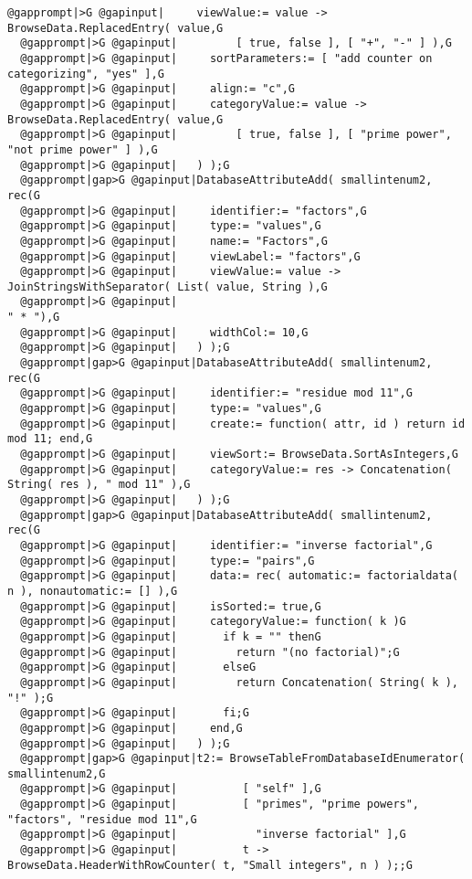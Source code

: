 \documentclass[a4paper,11pt]{report}
\begin{document}
{{\begin{Verbatim}[commandchars=@|G,fontsize=\small,frame=single,label=Example]
  @gapprompt|>G @gapinput|     viewValue:= value -> BrowseData.ReplacedEntry( value,G
  @gapprompt|>G @gapinput|         [ true, false ], [ "+", "-" ] ),G
  @gapprompt|>G @gapinput|     sortParameters:= [ "add counter on categorizing", "yes" ],G
  @gapprompt|>G @gapinput|     align:= "c",G
  @gapprompt|>G @gapinput|     categoryValue:= value -> BrowseData.ReplacedEntry( value,G
  @gapprompt|>G @gapinput|         [ true, false ], [ "prime power", "not prime power" ] ),G
  @gapprompt|>G @gapinput|   ) );G
  @gapprompt|gap>G @gapinput|DatabaseAttributeAdd( smallintenum2, rec(G
  @gapprompt|>G @gapinput|     identifier:= "factors",G
  @gapprompt|>G @gapinput|     type:= "values",G
  @gapprompt|>G @gapinput|     name:= "Factors",G
  @gapprompt|>G @gapinput|     viewLabel:= "factors",G
  @gapprompt|>G @gapinput|     viewValue:= value -> JoinStringsWithSeparator( List( value, String ),G
  @gapprompt|>G @gapinput|                                                    " * "),G
  @gapprompt|>G @gapinput|     widthCol:= 10,G
  @gapprompt|>G @gapinput|   ) );G
  @gapprompt|gap>G @gapinput|DatabaseAttributeAdd( smallintenum2, rec(G
  @gapprompt|>G @gapinput|     identifier:= "residue mod 11",G
  @gapprompt|>G @gapinput|     type:= "values",G
  @gapprompt|>G @gapinput|     create:= function( attr, id ) return id mod 11; end,G
  @gapprompt|>G @gapinput|     viewSort:= BrowseData.SortAsIntegers,G
  @gapprompt|>G @gapinput|     categoryValue:= res -> Concatenation( String( res ), " mod 11" ),G
  @gapprompt|>G @gapinput|   ) );G
  @gapprompt|gap>G @gapinput|DatabaseAttributeAdd( smallintenum2, rec(G
  @gapprompt|>G @gapinput|     identifier:= "inverse factorial",G
  @gapprompt|>G @gapinput|     type:= "pairs",G
  @gapprompt|>G @gapinput|     data:= rec( automatic:= factorialdata( n ), nonautomatic:= [] ),G
  @gapprompt|>G @gapinput|     isSorted:= true,G
  @gapprompt|>G @gapinput|     categoryValue:= function( k )G
  @gapprompt|>G @gapinput|       if k = "" thenG
  @gapprompt|>G @gapinput|         return "(no factorial)";G
  @gapprompt|>G @gapinput|       elseG
  @gapprompt|>G @gapinput|         return Concatenation( String( k ), "!" );G
  @gapprompt|>G @gapinput|       fi;G
  @gapprompt|>G @gapinput|     end,G
  @gapprompt|>G @gapinput|   ) );G
  @gapprompt|gap>G @gapinput|t2:= BrowseTableFromDatabaseIdEnumerator( smallintenum2,G
  @gapprompt|>G @gapinput|          [ "self" ],G
  @gapprompt|>G @gapinput|          [ "primes", "prime powers", "factors", "residue mod 11",G
  @gapprompt|>G @gapinput|            "inverse factorial" ],G
  @gapprompt|>G @gapinput|          t -> BrowseData.HeaderWithRowCounter( t, "Small integers", n ) );;G

\end{Verbatim}}}
\end{document}
